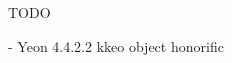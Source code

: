 \documentclass[11pt,letterpaper]{article}
\begin{document}
TODO 

- Yeon 4.4.2.2 kkeo object honorific %



\end{document}

